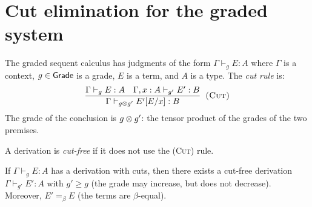 \section{Cut elimination for the graded system}
\label{sec:cut-elim}

\begin{definition}
\label{def:graded-sequent}
The graded sequent calculus has judgments of the form
$\Gamma \vdash_g E : A$ where $\Gamma$ is a context, $g \in \mathsf{Grade}$
is a grade, $E$ is a term, and $A$ is a type.  The \emph{cut rule}
is:
\[
  \dfrac{\Gamma \vdash_g E : A \quad \Gamma, x : A \vdash_{g'} E' : B}
    {\Gamma \vdash_{g \otimes g'} E'[E/x] : B}
  \;\;\textsc{(Cut)}
\]
The grade of the conclusion is $g \otimes g'$: the tensor product of
the grades of the two premises.
\end{definition}

\begin{definition}
A derivation is \emph{cut-free} if it does not use the \textsc{(Cut)}
rule.
\end{definition}

\begin{theorem}
\label{thm:cut-elim}
If $\Gamma \vdash_g E : A$ has a derivation with cuts, then there
exists a cut-free derivation $\Gamma \vdash_{g'} E' : A$ with
$g' \geq g$ (the grade may increase, but does not decrease).
Moreover, $E' =_\beta E$ (the terms are $\beta$-equal).
\end{theorem}

